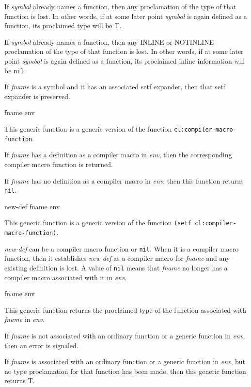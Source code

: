 If \textit{symbol} already names a function, then any proclamation of
the type of that function is lost.  In other words, if at some later
point \textit{symbol} is again defined as a function, its proclaimed
type will be T.

If \textit{symbol} already names a function, then any INLINE or
NOTINLINE proclamation of the type of that function is lost.  In other
words, if at some later point \textit{symbol} is again defined as a
function, its proclaimed inline information will be \texttt{nil}.

If \textit{fname} is a symbol and it has an associated setf
expander, then that setf expander is preserved.

 {fname env}

This generic function is a generic version of the \commonlisp{}
function \texttt{cl:compiler-macro-function}.

If \textit{fname} has a definition as a compiler macro in
\textit{env}, then the corresponding compiler macro function is
returned.

If \textit{fname} has no definition as a compiler macro in
\textit{env}, then this function returns \texttt{nil}.

 {new-def fname env}

This generic function is a generic version of the \commonlisp{}
function \texttt{(setf cl:compiler-macro-function)}.

\textit{new-def} can be a compiler macro function or \texttt{nil}.
When it is a compiler macro function, then it establishes
\textit{new-def} as a compiler macro for \textit{fname} and any
existing definition is lost.  A value of \texttt{nil} means that
\textit{fname} no longer has a compiler macro associated with it in
\textit{env}.

 {fname env}

This generic function returns the proclaimed type of the function
associated with \textit{fname} in \textit{env}.

If \textit{fname} is not associated with an ordinary function or a
generic function in \textit{env}, then an error is signaled.  

If \textit{fname} is associated with an ordinary function or a
generic function in \textit{env}, but no type proclamation for that
function has been made, then this generic function returns T.
